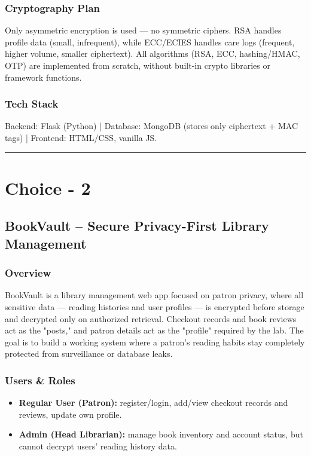 \documentclass{article}
\begin{document}
\subsubsection*{Cryptography Plan}
Only asymmetric encryption is used --- no symmetric ciphers. RSA handles profile data (small, infrequent), while ECC/ECIES handles care logs (frequent, higher volume, smaller ciphertext). All algorithms (RSA, ECC, hashing/HMAC, OTP) are implemented from scratch, without built-in crypto libraries or framework functions.

\subsubsection*{Tech Stack}
Backend: Flask (Python) | Database: MongoDB (stores only ciphertext + MAC tags) | Frontend: HTML/CSS, vanilla JS.

\vspace{1cm}
\hrule
\vspace{1cm}

\section*{Choice - 2}

\subsection*{BookVault -- Secure Privacy-First Library Management}

\subsubsection*{Overview}
BookVault is a library management web app focused on patron privacy, where all sensitive data --- reading histories and user profiles --- is encrypted before storage and decrypted only on authorized retrieval. Checkout records and book reviews act as the "posts," and patron details act as the "profile" required by the lab. The goal is to build a working system where a patron's reading habits stay completely protected from surveillance or database leaks.

\subsubsection*{Users \& Roles}
\begin{itemize}
    \item \textbf{Regular User (Patron):} register/login, add/view checkout records and reviews, update own profile.
    \item \textbf{Admin (Head Librarian):} manage book inventory and account status, but cannot decrypt users' reading history data.
\end{itemize}
\end{document}
